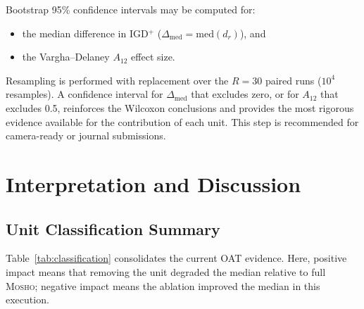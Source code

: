 \documentclass[11pt,a4paper]{article}
\newcommand{\mosho}{\textsc{Mosho}}
\begin{document}
Bootstrap 95\% confidence intervals may be computed for:
\begin{itemize}[leftmargin=2em, itemsep=2pt]
  \item the median difference in IGD$^+$
        ($\Delta_{\mathrm{med}} = \mathrm{med}(d_r)$), and
  \item the Vargha--Delaney $A_{12}$ effect size.
\end{itemize}

Resampling is performed with replacement over the $R=30$ paired runs
($10^4$ resamples).  A confidence interval for $\Delta_{\mathrm{med}}$
that excludes zero, or for $A_{12}$ that excludes 0.5, reinforces the
Wilcoxon conclusions and provides the most rigorous evidence available
for the contribution of each unit.  This step is recommended for
camera-ready or journal submissions.

\section{Interpretation and Discussion}
\label{sec:interp}

\subsection{Unit Classification Summary}
\label{sec:interp_class}

Table~\ref{tab:classification} consolidates the current OAT evidence.
Here, positive impact means that removing the unit degraded the median
relative to full \mosho{}; negative impact means the ablation improved
the median in this execution.
\end{document}
